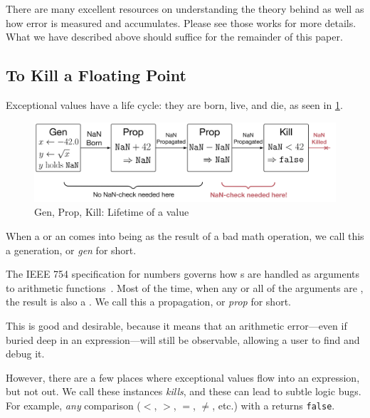 \documentclass{juliacon}
\begin{document}
There are many excellent resources\cite{knuthArtComputerProgramming1997,torontoPracticallyAccurateFloatingPoint2014} on understanding the theory behind \fp{} as well as how error is measured and accumulates.
Please see those works for more details.
What we have described above should suffice for the remainder of this paper.

\subsection{To Kill a Floating Point}
\label{s:to-kill-a-fp}

Exceptional values have a life cycle: they are born, live, and die, as seen in \cref{f:gpk}.

\begin{figure}
  \includegraphics[width=\columnwidth]{fig/genpropkill-outline.png}
  \caption{Gen, Prop, Kill: Lifetime of a \NaN{} value}
  \label{f:gpk}
\end{figure}

When a \NaN{} or an \Inf{} comes into being as the result of a bad math operation, we call this a generation, or \emph{gen} for short.

The IEEE 754 specification for \fp{} numbers governs how \NaN{}s are handled as arguments to arithmetic functions~\cite{IEEEStandardBinary1985}.
Most of the time, when any or all of the arguments are \NaN{}, the result is also a \NaN{}.
We call this a propagation, or \emph{prop} for short.

This is good and desirable, because it means that an arithmetic error---even if buried deep in an expression---will still be observable, allowing a user to find and debug it.

However, there are a few places where exceptional values flow into an expression, but not out.
We call these instances \emph{kills}, and these can lead to subtle logic bugs.
For example, \emph{any} comparison ($<$, $>$, $=$, $\neq$, etc.) with a \NaN{} returns \texttt{false}.
\end{document}
